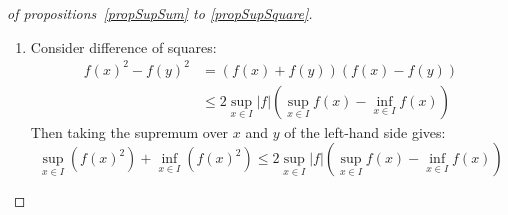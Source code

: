 \documentclass[../Main.tex]{subfiles}
\begin{document}
\begin{proof}[of propositions~\ref{propSupSum} to \ref{propSupSquare}]
\begin{enumerate}
\begin{case}{$f(x)$ takes values either side of 0}
\begin{align*}
                    &= \max\{\sup_{x \in I} f(x), \sup_{x \in I} (-f(x))\} \\
                    &\leq \sup_{x \in I} f(x) + \sup_{x \in I} (-f(x)) \\
                    &= \sup_{x \in I} f(x) - \inf_{x \in I} f(x)
                \end{align*}
            \end{case}
        \item Consider difference of squares:
            \begin{align*}
                f(x)^2 - f(y)^2 &= (f(x) + f(y))(f(x) - f(y)) \\
                &\leq 2\sup_{x \in I} |f| \left(\sup_{x \in I} f(x) - \inf_{x \in I} f(x)\right)
            \end{align*}
            Then taking the supremum over $x$ and $y$ of the left-hand side gives:
            \begin{equation*}
                \sup_{x \in I}(f(x)^2) + \inf_{x \in I} (f(x)^2) \leq 2 \sup_{x \in I} |f| \left(\sup_{x \in I} f(x) - \inf_{x \in I} f(x)\right)
            \end{equation*}
    \end{enumerate}
\end{proof}
\end{document}
